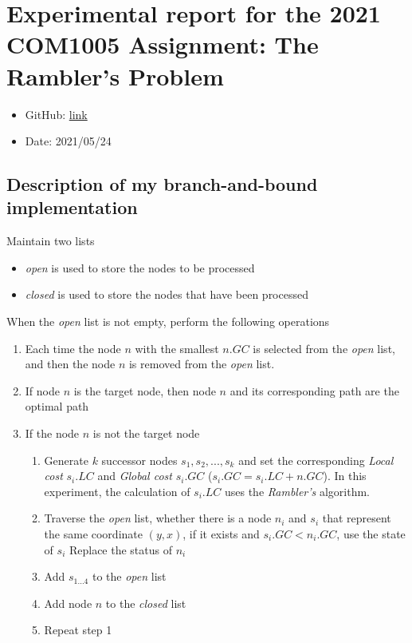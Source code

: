 \documentclass[
]{article}
\author{}
\date{}
\begin{document}
\hypertarget{header-n320}{%
\section{Experimental report for the 2021 COM1005 Assignment: The
Rambler's Problem}\label{header-n320}}

\begin{itemize}
\item
  GitHub:
  \href{https://github.com/JiaaoWang04/COM1005_Assignment_Report.git}{link}
\item
  Date: 2021/05/24
\end{itemize}

\hypertarget{header-n327}{%
\subsection{Description of my branch-and-bound
implementation}\label{header-n327}}

Maintain two lists

\begin{itemize}
\item
  \emph{open} is used to store the nodes to be processed
\item
  \emph{closed} is used to store the nodes that have been processed
\end{itemize}

When the \emph{open} list is not empty, perform the following operations

\begin{enumerate}
\def\labelenumi{\arabic{enumi}.}
\item
  Each time the node \(n\) with the smallest \(n.GC\) is selected from
  the \emph{open} list, and then the node \(n\) is removed from the
  \emph{open} list.
\item
  If node \(n\) is the target node, then node \(n\) and its
  corresponding path are the optimal path
\item
  If the node \(n\) is not the target node

  \begin{enumerate}
  \def\labelenumii{\arabic{enumii}.}
  \item
    Generate \(k\) successor nodes \(s_1, s_2, ..., s_k\) and set the
    corresponding \emph{Local cost} \(s_i.LC\) and \emph{Global cost}
    \(s_i.GC\) (\(s_i.GC = s_i. LC + n.GC\)). In this experiment, the
    calculation of \(s_i.LC\) uses the \emph{Rambler's} algorithm.
  \item
    Traverse the \emph{open} list, whether there is a node \(n_i\) and
    \(s_i\) that represent the same coordinate \((y, x)\), if it exists
    and \(s_i.GC <n_i.GC\), use the state of \(s_i\) Replace the status
    of \(n_i\)
  \item
    Add \(s_{1...4}\) to the \emph{open} list
  \item
    Add node \(n\) to the \emph{closed} list
  \item
    Repeat step 1
  \end{enumerate}
\end{enumerate}
\end{document}
